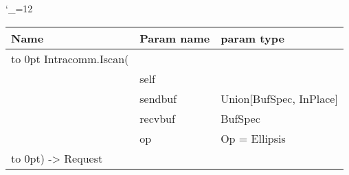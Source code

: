 \begingroup \catcode`\_=12 \tt
\begin{tabular}{lll}
\toprule
\textrm{Name}&\textrm{Param name}&\textrm{param type}\\
\midrule
\hbox to 0pt {Intracomm.Iscan(\hss}\\
& self\\
& sendbuf & Union[BufSpec, InPlace]\\
& recvbuf & BufSpec\\
& op & Op = Ellipsis\\
\hbox to 0pt{) -> Request\hss}\\
\bottomrule
\end{tabular}
\endgroup

